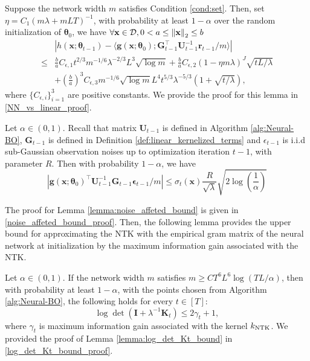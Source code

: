 \begin{sublemma} 
\label{lemma:NN_vs_linear}
Suppose the network width $m$ satisfies Condition \ref{cond:set}.
Then, set $\eta = C_1(m\lambda + mLT)^{-1}$, with probability at least $1 - \alpha$ over the random initialization of $\boldsymbol{\theta}_0$, we have $\forall \mathbf{x} \in \mathcal{D}, 0 < a \leq \norm{\bf x}_2  \leq b$
\begin{equation*}
\begin{split}
    & \left \lvert h(\mathbf{x}; \boldsymbol{\theta}_{t-1})- \langle \mathbf{g}(\mathbf{x}; \boldsymbol{\theta}_0); \mathbf{G}_{t-1}^\top \mathbf{U}^{-1}_{t-1} \mathbf{r}_{t-1}/m \rangle \right\rvert \\ 
    \leq &  \frac{b}{a} C_{\epsilon,1} t^{2/3}m^{-1/6} \lambda^{-2/3} L^3 \sqrt{\log m} + \frac{b}{a} C_{\epsilon,2}(1 - \eta m \lambda)^J \sqrt{tL/ \lambda}\\
    & + \left(\frac{b}{a} \right)^3 C_{\epsilon,3} m^{-1/6} \sqrt{\log m} L^4 t^{5/3} \lambda ^{-5/3} \left(1 + \sqrt{t/\lambda} \right),
\end{split}
\end{equation*}
where $\{C_{\epsilon,i}\}_{i=1}^3$ are positive constants. We provide the proof for this lemma in \ref{NN_vs_linear_proof}.
\end{sublemma}

\begin{sublemma}
\label{lemma:noise_affeted_bound}
Let $\alpha \in (0,1)$. Recall that matrix $\mathbf{U}_{t-1}$ is defined in Algorithm \ref{alg:Neural-BO}, $\mathbf{G}_{t-1}$ is defined in Definition \ref{def:linear_kernelized_terms} and $\mathcal{\epsilon}_{t-1}$ is i.i.d sub-Gaussian  observation noises up to optimization iteration $t-1$, with parameter $R$. Then with probability  $1-\alpha$, we have
\[ \left\lvert \mathbf{g}(\mathbf{x}; \boldsymbol{\theta}_0)^\top \mathbf{U}^{-1}_{t-1} \mathbf{G}_{t-1} \boldsymbol{\epsilon}_{t-1}/m   \right\rvert \leq \sigma_t(\mathbf{x})\frac{R}{\sqrt{\lambda}} \sqrt{2 \log(\frac{1}{\alpha})}\]
\end{sublemma}
The proof for Lemma \ref{lemma:noise_affeted_bound} is given in \ref{noise_affeted_bound_proof}. Then, the following lemma provides the upper bound for approximating the NTK with the empirical gram matrix of the neural network at initialization by the maximum information gain associated with the NTK. 

\begin{sublemma}
\label{lemma:log_det_Kt_bound}
Let $\alpha \in (0,1)$. If the network width $m$ satisfies  $m \geq C T^6L^6 \log(TL/\alpha)$, then with probability at least $1-\alpha$, with the points chosen from Algorithm \ref{alg:Neural-BO}, the following holds for every $t \in [T]$:
\[ \log \det (\mathbf{I} + \lambda^{-1} \mathbf{K}_t) \le 2\gamma_t + 1,\]
where $\gamma_t$ is maximum information gain associated with the kernel $k_\textup{NTK}$. We provided the proof of Lemma \ref{lemma:log_det_Kt_bound} in \ref{log_det_Kt_bound_proof}.
\end{sublemma}

